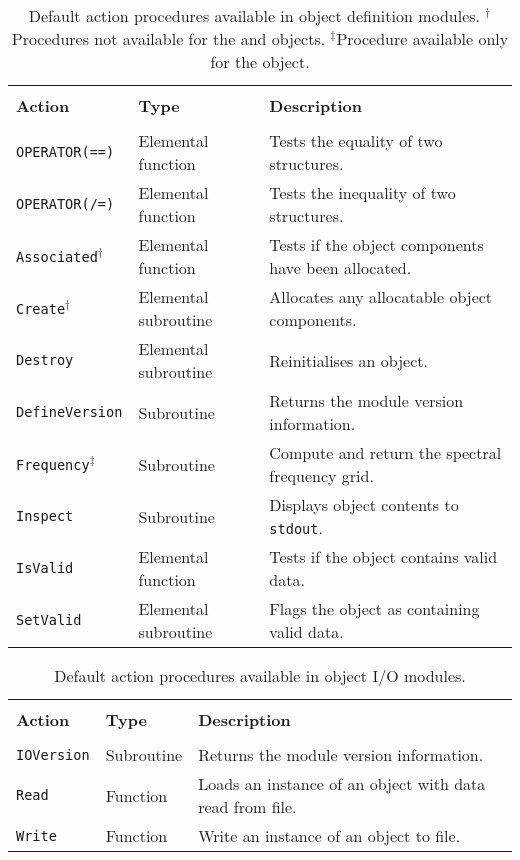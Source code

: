 \begin{table}[htp]
  \centering
  \caption{Default action procedures available in object definition modules. $^{\dagger}$Procedures not available for the \Fhdr{} and \Phdr{} objects. $^{\ddagger}$Procedure available only for the \Layer{} object.}
  \begin{tabular}{p{2.5cm} p{3.5cm} p{8.5cm}}
    \hline\\[-0.1cm]
    \sffamily\textbf{Action} & \sffamily\textbf{Type} & \sffamily\textbf{Description} \\
    \hline\hline\\[-0.2cm]
    \texttt{OPERATOR(==)}             & Elemental function   & Tests the equality of two structures. \\
    \texttt{OPERATOR(/=)}             & Elemental function   & Tests the inequality of two structures. \\
    \texttt{Associated}$^{\dagger}$   & Elemental function   & Tests if the object components have been allocated. \\
    \texttt{Create}$^{\dagger}$       & Elemental subroutine & Allocates any allocatable object components. \\
    \texttt{Destroy}                  & Elemental subroutine & Reinitialises an object. \\
    \texttt{DefineVersion}            & Subroutine           & Returns the module version information. \\
    \texttt{Frequency}$^{\ddagger}$   & Subroutine           & Compute and return the spectral frequency grid. \\
    \texttt{Inspect}                  & Subroutine           & Displays object contents to \texttt{stdout}. \\
    \texttt{IsValid}                  & Elemental function   & Tests if the object contains valid data. \\
    \texttt{SetValid}                 & Elemental subroutine & Flags the object as containing valid data. \\
  \hline
  \end{tabular}
  \label{tab:definition_module_default_procedures}
\end{table}

\begin{table}[htp]
  \centering
  \caption{Default action procedures available in object I/O modules.}
  \begin{tabular}{p{2.5cm} p{3.5cm} p{8.5cm}}
    \hline\\[-0.1cm]
    \sffamily\textbf{Action} & \sffamily\textbf{Type} & \sffamily\textbf{Description} \\
    \hline\hline\\[-0.2cm]
    \texttt{IOVersion} & Subroutine  & Returns the module version information. \\
    \texttt{Read}      & Function    & Loads an instance of an object with data read from file. \\
    \texttt{Write}     & Function    & Write an instance of an object to file. \\
  \hline
  \end{tabular}
  \label{tab:io_module_default_procedures}
\end{table}

